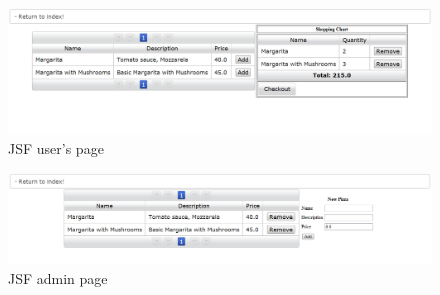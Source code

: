 \begin{figure}[H]
    \begin{center}
        \includegraphics[width=\textwidth]{fig/jsf_buy.png}
        \caption{JSF user's page}
        \label{fig.jsp_index}
    \end{center}
\end{figure}

\begin{figure}[H]
    \begin{center}
        \includegraphics[width=\textwidth]{fig/jsf_admin.png}
        \caption{JSF admin page}
        \label{fig.jsp_index}
    \end{center}
\end{figure}